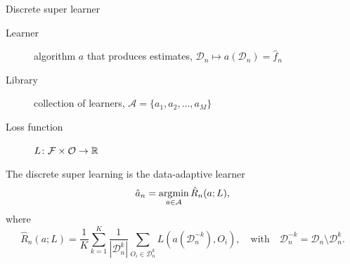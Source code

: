 \documentclass[smaller]{beamer}\usepackage{listings}
\begin{document}
\begin{frame}[label={sec:orga8ac7a8}]{Discrete super learner}
\small

\begin{description}
\item[{Learner}] algorithm \(a\) that produces estimates, \(\mathcal{D}_n \mapsto
  a(\mathcal{D}_n) = \hat f_n\)
\item[{Library}] collection of learners, \(\mathcal{A} = \{a_1, a_2, \dots, a_M \}\)
\item[{Loss function}] \(L \colon \mathcal{F} \times \mathcal{O} \rightarrow \mathbb{R}\)
\end{description}

\vfill

The discrete super learning is the data-adaptive learner
\begin{equation*}
  \hat{a}_n = \operatorname*{\arg\!\min}_{a\in\mathcal A}\hat{R}_n(a; L),
\end{equation*}
where
\begin{equation*}
  \hat{R}_n(a; L) =
  \frac{1}{K}\sum_{k=1}^{K}
  \frac{1}{| \mathcal{D}_n^{k} |}\sum_{O_i \in \mathcal{D}_n^{k}}
  L
  {
    \left(
      a{ (\mathcal{D}_n^{-k})}
      , O_i
    \right)
  },
  \quad \text{with} \quad
  \mathcal{D}_n^{-k} = \mathcal{D}_n \setminus \mathcal{D}_n^{k}.
\end{equation*}
\end{frame}
\end{document}
